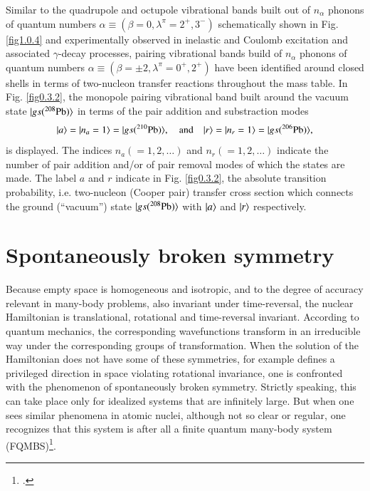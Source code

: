 Similar to the quadrupole and octupole vibrational bands built out of $n_\alpha$ phonons of quantum numbers $\alpha\equiv(\beta=0,\lambda^\pi=2^+,3^-)$ schematically shown in Fig. \ref{fig1.0.4} and experimentally observed in inelastic and Coulomb excitation and associated $\gamma$-decay processes, pairing vibrational bands build of $n_\alpha$ phonons of quantum numbers $\alpha\equiv(\beta=\pm2,\lambda^\pi=0^+,2^+)$ have been identified around closed shells in terms of two-nucleon transfer reactions throughout the mass table. In Fig. \ref{fig0.3.2}, the monopole pairing vibrational band built around the vacuum state $|{gs(^{208}\text{Pb})} \rangle$ in terms of the pair addition and substraction modes
\begin{align}\label{eq1.3.9}
|{a} \rangle=|{n_a=1} \rangle=|{gs(^{210}\text{Pb})} \rangle,\quad\text{and}\quad |{r} \rangle=|{n_r=1} \rangle=|{gs(^{206}\text{Pb})} \rangle,
\end{align}
is displayed. The indices $n_a(=1,2,\dots)$ and $n_r(=1,2,\dots)$ indicate the number of pair addition and/or of pair removal modes of which the states are made. The label $a$ and $r$ indicate in Fig. \ref{fig0.3.2}, the absolute transition probability, i.e. two-nucleon (Cooper pair) transfer cross section which connects the ground (``vacuum'') state $|{gs(^{208}\text{Pb})} \rangle$ with $|{a} \rangle$ and $|{r} \rangle$ respectively. 
\section{Spontaneously broken symmetry}\label{S1.4}
Because empty space is homogeneous and isotropic, and to the degree of accuracy relevant in many-body problems, also invariant under time-reversal, the nuclear Hamiltonian is translational, rotational and time-reversal invariant. According to quantum mechanics, the corresponding wavefunctions transform in an irreducible way under the corresponding groups of transformation.
When the solution  of the Hamiltonian does not have some of these symmetries, for example defines a privileged direction in space violating rotational invariance, one is confronted with the phenomenon of spontaneously broken symmetry. Strictly speaking, this can take place only for idealized systems that are infinitely large. But when one sees similar phenomena in atomic nuclei, although not so clear or regular, one recognizes that this system is after all a finite quantum many-body system (FQMBS)\footnote{\cite{Anderson:72,Anderson:84b}.}.
